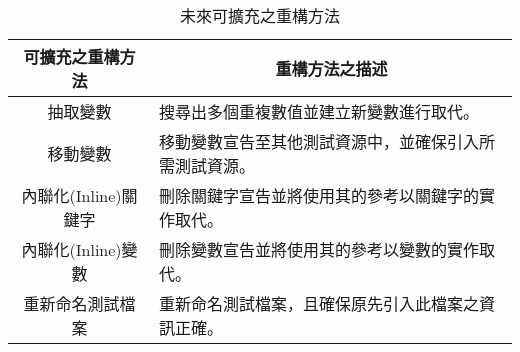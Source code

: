 \begin{table}[H]
    \begin{center}
    \caption{未來可擴充之重構方法}\label{t6.1}
        \begin{tabular}{|c|l|}\hline
        可擴充之重構方法           & \multicolumn{1}{c|}{重構方法之描述}    \\\hline
        抽取變數                 & 搜尋出多個重複數值並建立新變數進行取代。    \\\hline
        移動變數                 & 移動變數宣告至其他測試資源中，並確保引入所需測試資源。    \\\hline
        內聯化(Inline)關鍵字      & 刪除關鍵字宣告並將使用其的參考以關鍵字的實作取代。    \\\hline
        內聯化(Inline)變數        & 刪除變數宣告並將使用其的參考以變數的實作取代。    \\\hline
        重新命名測試檔案           & 重新命名測試檔案，且確保原先引入此檔案之資訊正確。    \\\hline
        \end{tabular}
    \end{center}
\end{table}